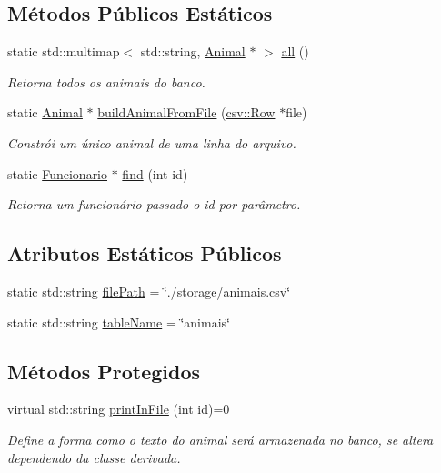 \subsection*{Métodos Públicos Estáticos}
\begin{DoxyCompactItemize}
\item 
static std\+::multimap$<$ std\+::string, \hyperlink{classAnimal}{Animal} $\ast$ $>$ \hyperlink{classAnimal_a342dd3f74afeeadd169e792db6f04845}{all} ()
\begin{DoxyCompactList}\small\item\em Retorna todos os animais do banco. \end{DoxyCompactList}\item 
static \hyperlink{classAnimal}{Animal} $\ast$ \hyperlink{classAnimal_a8b0e3217c72fa8de0316828c6385dd99}{build\+Animal\+From\+File} (\hyperlink{classcsv_1_1Row}{csv\+::\+Row} $\ast$file)
\begin{DoxyCompactList}\small\item\em Constrói um único animal de uma linha do arquivo. \end{DoxyCompactList}\item 
static \hyperlink{classFuncionario}{Funcionario} $\ast$ \hyperlink{classAnimal_afe18aa534325e42d39f3e778bcc89732}{find} (int id)
\begin{DoxyCompactList}\small\item\em Retorna um funcionário passado o id por parâmetro. \end{DoxyCompactList}\end{DoxyCompactItemize}
\subsection*{Atributos Estáticos Públicos}
\begin{DoxyCompactItemize}
\item 
static std\+::string \hyperlink{classAnimal_a1e487e8b5e047f764f192a423e4d21ae}{file\+Path} = \char`\"{}./storage/animais.\+csv\char`\"{}
\item 
static std\+::string \hyperlink{classAnimal_a09d2d66762ed1fea5c6858d092b6ccb9}{table\+Name} = \char`\"{}animais\char`\"{}
\end{DoxyCompactItemize}
\subsection*{Métodos Protegidos}
\begin{DoxyCompactItemize}
\item 
virtual std\+::string \hyperlink{classAnimal_ac75406040726a6339932d70164cc7242}{print\+In\+File} (int id)=0
\begin{DoxyCompactList}\small\item\em Define a forma como o texto do animal será armazenada no banco, se altera dependendo da classe derivada. \end{DoxyCompactList}\end{DoxyCompactItemize}
